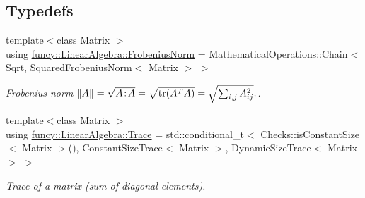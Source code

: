 \subsection*{Typedefs}
\begin{DoxyCompactItemize}
\item 
{\footnotesize template$<$class Matrix $>$ }\\using \hyperlink{group__LinearAlgebraGroup_ga38eae956615afce1e62bbd7c465688b4}{funcy\-::\-Linear\-Algebra\-::\-Frobenius\-Norm} = Mathematical\-Operations\-::\-Chain$<$ Sqrt, Squared\-Frobenius\-Norm$<$ Matrix $>$ $>$
\begin{DoxyCompactList}\small\item\em Frobenius norm $ \|A\| = \sqrt{A\negthinspace : \negthinspace A }= \sqrt{\mathrm{tr}(A^TA)} = \sqrt{\sum_{i,j} A_{ij}^2}. $. \end{DoxyCompactList}\item 
{\footnotesize template$<$class Matrix $>$ }\\using \hyperlink{group__LinearAlgebraGroup_ga5771b42f6ae0c554253a3602f6151b00}{funcy\-::\-Linear\-Algebra\-::\-Trace} = std\-::conditional\-\_\-t$<$ Checks\-::is\-Constant\-Size$<$ Matrix $>$(), Constant\-Size\-Trace$<$ Matrix $>$, Dynamic\-Size\-Trace$<$ Matrix $>$ $>$
\begin{DoxyCompactList}\small\item\em Trace of a matrix (sum of diagonal elements). \end{DoxyCompactList}\end{DoxyCompactItemize}
